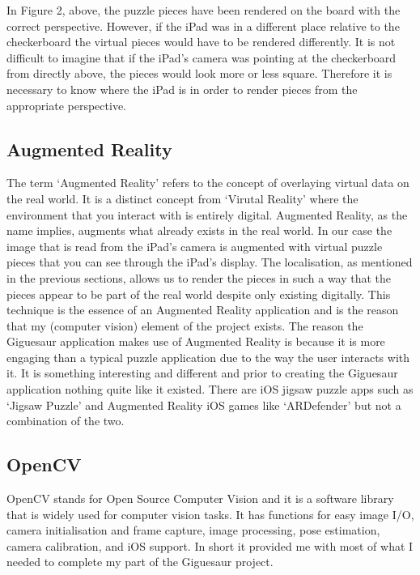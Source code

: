 \documentclass{article}
\begin{document}
In Figure 2, above, the puzzle pieces have been rendered on the board with the correct perspective. However, if the iPad was in a different place relative to the checkerboard the virtual pieces would have to be rendered differently. It is not difficult to imagine that if the iPad's camera was pointing at the checkerboard from directly above, the pieces would look more or less square. Therefore it is necessary to know where the iPad is in order to render pieces from the appropriate perspective.

\subsection{Augmented Reality}
The term `Augmented Reality' refers to the concept of overlaying virtual data on the real world. It is a distinct concept from `Virutal Reality' where the environment that you interact with is entirely digital. Augmented Reality, as the name implies, augments what already exists in the real world. In our case the image that is read from the iPad's camera is augmented with virtual puzzle pieces that you can see through the iPad's display. The localisation, as mentioned in the previous sections, allows us to render the pieces in such a way that the pieces appear to be part of the real world despite only existing digitally. This technique is the essence of an Augmented Reality application and is the reason that my (computer vision) element of the project exists. The reason the Giguesaur application makes use of Augmented Reality is because it is more engaging than a typical puzzle application due to the way the user interacts with it. It is something interesting and different and prior to creating the Giguesaur application nothing quite like it existed. There are iOS jigsaw puzzle apps such as `Jigsaw Puzzle' \cite{ref:JigsawPuzzle} and Augmented Reality iOS games like `ARDefender' \cite{img:ARDefender} but not a combination of the two. 


\subsection{OpenCV}

OpenCV stands for Open Source Computer Vision and it is a software library that is widely used for computer vision tasks. It has functions for easy image I/O, camera initialisation and frame capture, image processing, pose estimation, camera calibration, and iOS support. In short it provided me with most of what I needed to complete my part of the Giguesaur project.
\end{document}
